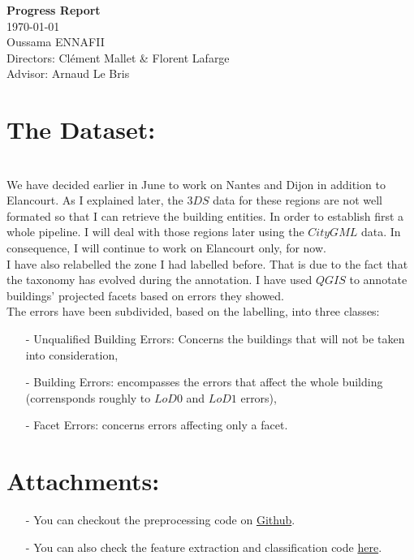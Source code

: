 \documentclass[a4paper, 11pt]{article}
\begin{document}
	\begin{centering}
		\Large{\textbf{Progress Report}}\\
		\large{\today}
~\\
		Oussama ENNAFII\\
		Directors: Cl\'ement Mallet \& Florent Lafarge \\
		Advisor: Arnaud Le Bris \\

	\end{centering}


	\section{The Dataset:}
~\\

	We have decided earlier in June to work on Nantes and Dijon in addition to
	Elancourt. As I explained later, the $3DS$ data for these regions are not
	well formated so that I can retrieve the building entities. In order to
	establish first a whole pipeline. I will deal with those regions later using
	the $CityGML$ data. In consequence, I will continue to work on Elancourt
	only, for now.\\

	I have also relabelled the zone I had labelled before. That is due to the fact
	that the taxonomy has evolved during the annotation. I have used $QGIS$ to
	annotate buildings' projected facets based on errors they showed.\\

	The errors have been subdivided, based on the labelling, into three classes:
	\begin{itemize}
		\item[-] Unqualified Building Errors: Concerns the buildings that will not
		be taken into consideration,
		\item[-] Building Errors: encompasses the errors that affect the whole
		building (corrensponds roughly to $LoD0$ and $LoD1$ errors),
		\item[-] Facet Errors: concerns errors affecting only a facet.
	\end{itemize}



\section*{Attachments:}

\begin{itemize}
	\item[-] You can checkout the preprocessing code on
	\href{https://github.com/ethiy/proj.city}{Github}.
	\item[-] You can also check the feature extraction and classification code
	\href{https://github.com/ethiy/qualcity}{here}.
\end{itemize}
\end{document}

